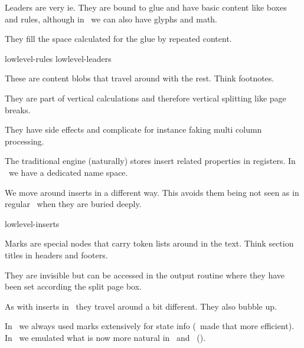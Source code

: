 \startitem
    Leaders are very \TEX ie. They are bound to glue and have basic content like
    boxes and rules, although in \LUAMETATEX\ we can also have glyphs and math.
\stopitem

\startitem
    They fill the space calculated for the glue by repeated content.
\stopitem

\stopitemize

\blank[3*big]

\starttyping
lowlevel-rules   %
lowlevel-leaders %
\stoptyping

\stoptitle

\starttitle[title=Inserts]

\startitemize

\startitem
    These are content blobs that travel around with the rest. Think footnotes.
\stopitem

\startitem
    They are part of vertical calculations and therefore vertical splitting like
    page breaks.
\stopitem

\startitem
    They have side effects and complicate for instance faking multi column
    processing.
\stopitem

\startitem
    The traditional engine (naturally) stores insert related properties in
    registers. In \LUAMETATEX\ we have a dedicated name space.
\stopitem

\startitem
    We move around inserts in a different way. This avoids them being not seen as
    in regular \TEX\ when they are buried deeply.
\stopitem

\stopitemize

\blank[3*big]

\starttyping
lowlevel-inserts
\stoptyping

\stoptitle

\starttitle[title=Marks]

\startitemize

\startitem
    Marks are special nodes that carry token lists around in the text. Think
    section titles in headers and footers.
\stopitem

\startitem
    They are invisible but can be accessed in the output routine where
    they have been set according the split page box.
\stopitem

\startitem
    As with inserts in \LUAMETATEX\ they travel around a bit different. They also
    bubble up.
\stopitem

\startitem
    In \MKII\ we always used marks extensively for state info (\ETEX\ made
    that more efficient). In \MKIV\ we emulated what is now more natural in
    \LUAMETATEX\ and \MKIX\ (\LMTX).
\stopitem

